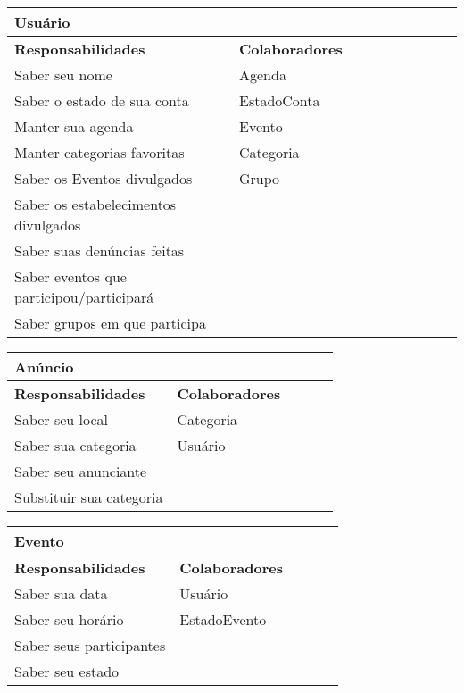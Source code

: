 \documentclass{article}
\begin{document}
\begin{center}
 \begin{tabular}{|p{0.5\linewidth}|p{0.5\linewidth}|}
  \hline
  \multicolumn{2}{|p{\textwidth}|}{
   {\large \textbf{Usuário}}} \\
  \hline
  \textbf{Responsabilidades} & \textbf{Colaboradores} \\ 
  \hline
  Saber seu nome &  Agenda \\
  \hline 
  Saber o estado de sua conta & EstadoConta \\
  \hline
  Manter sua agenda & Evento \\
  \hline
  Manter categorias favoritas & Categoria \\
  \hline
  Saber os Eventos divulgados & Grupo  \\
  \hline
  Saber os estabelecimentos divulgados &  \\
  \hline
  Saber suas denúncias feitas &  \\
  \hline
  Saber eventos que participou/participará &  \\
  \hline
  Saber grupos em que participa & \\  
  \hline
 \end{tabular} 
\end{center}

    \begin{center}
   	 \begin{tabular}{|p{0.5\linewidth}|p{0.5\linewidth}|}
\hline
 	\multicolumn{2}{|p{\textwidth}|}{
{\large \textbf{Anúncio}}
}  \\
\hline
\textbf{Responsabilidades} & \textbf{Colaboradores} \\ 
\hline
  	Saber seu local & Categoria  \\
  	\hline
  	Saber sua categoria & Usuário \\
  	\hline
  	Saber seu anunciante &  \\
  	\hline
  	Substituir sua categoria & \\
  	\hline
   	\end{tabular} 
    \end{center}

    

    \begin{center}
   	 \begin{tabular}{|p{0.5\linewidth}|p{0.5\linewidth}|}
\hline
 	\multicolumn{2}{|p{\textwidth}|}{
{\large \textbf{Evento}}
}  \\
\hline
\textbf{Responsabilidades} & \textbf{Colaboradores} \\ 
\hline
  	Saber sua data & Usuário \\
  	\hline
  	Saber seu horário & EstadoEvento \\
  	\hline
  	Saber seus participantes & \\
	\hline
	Saber seu estado & \\
  	\hline
   	\end{tabular} 
    \end{center}
\end{document}
